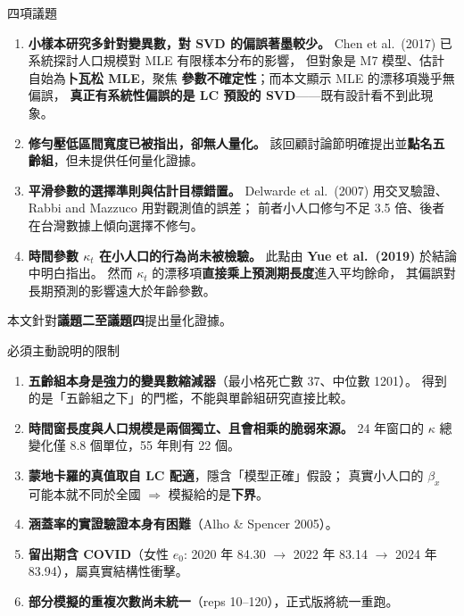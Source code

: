 \documentclass[aspectratio=169, UTF8, fontset=macnew, 11pt]{ctexbeamer}
\newcommand{\hi}[1]{\textcolor{red!70!black}{\textbf{#1}}}
\begin{document}
\begin{frame}{四項議題}
\begin{enumerate}\small\setlength{\itemsep}{7pt}
  \item \textbf{小樣本研究多針對變異數，對 SVD 的偏誤著墨較少。}
        Chen et al.\ (2017) 已系統探討人口規模對 MLE 有限樣本分布的影響，
        但對象是 M7 模型、估計自始為\textbf{卜瓦松 MLE}，聚焦
        \textbf{參數不確定性}；而本文顯示 MLE 的漂移項幾乎無偏誤，
        \hi{真正有系統性偏誤的是 LC 預設的 SVD}——既有設計看不到此現象。
  \item \textbf{修勻壓低區間寬度已被指出，卻無人量化。}
        該回顧討論節明確提出並\textbf{點名五齡組}，但未提供任何量化證據。
  \item \textbf{平滑參數的選擇準則與估計目標錯置。}
        Delwarde et al.\ (2007) 用交叉驗證、Rabbi and Mazzuco 用對觀測值的誤差；
        前者小人口修勻不足 3.5 倍、後者在台灣數據上傾向選擇不修勻。
  \item \hi{\textbf{時間參數 $\kappa_t$ 在小人口的行為尚未被檢驗。}}
        此點由 \textbf{Yue et al.\ (2019)} 於結論中明白指出。
        然而 $\kappa_t$ 的漂移項\textbf{直接乘上預測期長度}進入平均餘命，
        其偏誤對長期預測的影響遠大於年齡參數。
\end{enumerate}
\vspace{4pt}
\centerline{\small 本文針對\textbf{議題二至議題四}提出量化證據。}
\end{frame}

\begin{frame}{必須主動說明的限制}
\begin{enumerate}\small\setlength{\itemsep}{6pt}
  \item \textbf{五齡組本身是強力的變異數縮減器}（最小格死亡數 37、中位數 1201）。
        得到的是「五齡組之下」的門檻，不能與單齡組研究直接比較。
  \item \textbf{時間窗長度與人口規模是兩個獨立、且會相乘的脆弱來源。}
        24 年窗口的 $\kappa$ 總變化僅 8.8 個單位，55 年則有 22 個。
  \item \textbf{蒙地卡羅的真值取自 LC 配適}，隱含「模型正確」假設；
        真實小人口的 $\beta_x$ 可能本就不同於全國 $\Rightarrow$ 模擬給的是\textbf{下界}。
  \item \textbf{涵蓋率的實證驗證本身有困難}（Alho \& Spencer 2005）。
  \item \textbf{留出期含 COVID}（女性 $e_0$: 2020 年 84.30 $\to$ 2022 年 83.14
        $\to$ 2024 年 83.94），屬真實結構性衝擊。
  \item \textbf{部分模擬的重複次數尚未統一}（reps 10--120），正式版將統一重跑。
\end{enumerate}
\end{frame}
\end{document}

